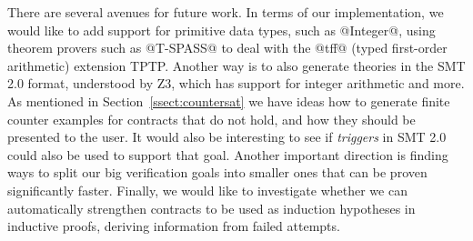 
There are several avenues for future work.  In terms of our
implementation, we would like to add support for primitive data types,
such as @Integer@, using theorem provers such as @T-SPASS@ to deal
with the @tff@ (typed first-order arithmetic) extension TPTP. Another
way is to also generate theories in the SMT 2.0 format, understood by
Z3, which has support for integer arithmetic and more. As mentioned in
Section~\ref{ssect:countersat} we have ideas how to generate finite
counter examples for contracts that do not hold, and how they should
be presented to the user. It would also be interesting to see if
\emph{triggers} in SMT 2.0 could also be used to support that goal.
Another important direction is finding ways to split our big
verification goals into smaller ones that can be proven significantly
faster. Finally, we would like to investigate whether we can
automatically strengthen contracts to be used as induction hypotheses
in inductive proofs, deriving information from failed attempts.

